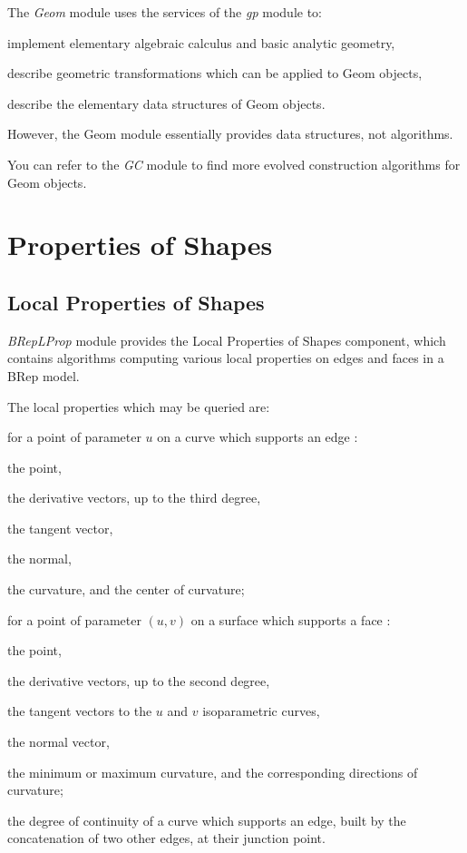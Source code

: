 The {\itshape Geom} module uses the services of the {\itshape gp} module to\+:
\begin{DoxyItemize}
\item implement elementary algebraic calculus and basic analytic geometry,
\item describe geometric transformations which can be applied to Geom objects,
\item describe the elementary data structures of Geom objects.
\end{DoxyItemize}

However, the Geom module essentially provides data structures, not algorithms.

You can refer to the {\itshape GC} module to find more evolved construction algorithms for Geom objects.\hypertarget{occt_user_guides__modeling_data_occt_modat_4}{}\section{Properties of Shapes}\label{occt_user_guides__modeling_data_occt_modat_4}
\hypertarget{occt_user_guides__modeling_data_occt_modat_4_1}{}\subsection{Local Properties of Shapes}\label{occt_user_guides__modeling_data_occt_modat_4_1}
{\itshape B\+Rep\+L\+Prop} module provides the Local Properties of Shapes component, which contains algorithms computing various local properties on edges and faces in a B\+Rep model.

The local properties which may be queried are\+:


\begin{DoxyItemize}
\item for a point of parameter $u$ on a curve which supports an edge \+:
\begin{DoxyItemize}
\item the point,
\item the derivative vectors, up to the third degree,
\item the tangent vector,
\item the normal,
\item the curvature, and the center of curvature;
\end{DoxyItemize}
\item for a point of parameter $(u, v)$ on a surface which supports a face \+:
\begin{DoxyItemize}
\item the point,
\item the derivative vectors, up to the second degree,
\item the tangent vectors to the $u$ and $v$ isoparametric curves,
\item the normal vector,
\item the minimum or maximum curvature, and the corresponding directions of curvature;
\end{DoxyItemize}
\item the degree of continuity of a curve which supports an edge, built by the concatenation of two other edges, at their junction point.
\end{DoxyItemize}

